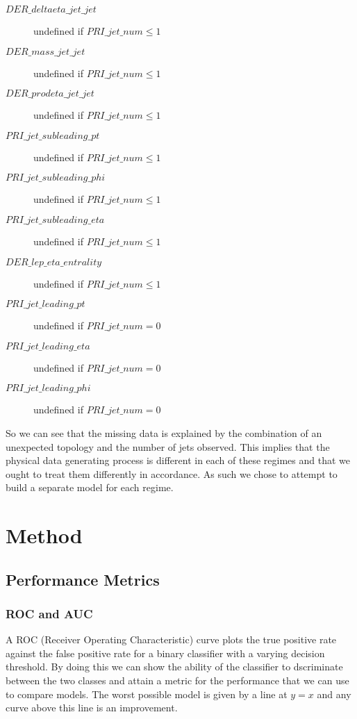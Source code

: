 \begin{description}
    \item[$DER\_deltaeta\_jet\_jet$] undefined if $PRI\_jet\_num \leq 1$
    \item[$DER\_mass\_jet\_jet$] undefined if $PRI\_jet\_num \leq 1$
    \item[$DER\_prodeta\_jet\_jet$] undefined if $PRI\_jet\_num \leq 1$
    \item[$PRI\_jet\_subleading\_pt$] undefined if $PRI\_jet\_num \leq 1$
    \item[$PRI\_jet\_subleading\_phi$] undefined if $PRI\_jet\_num \leq 1$
    \item[$PRI\_jet\_subleading\_eta$] undefined if $PRI\_jet\_num \leq 1$
    \item[$DER\_lep\_eta\_entrality$] undefined if $PRI\_jet\_num \leq 1$
    \item[$PRI\_jet\_leading\_pt$] undefined if $PRI\_jet\_num = 0$
    \item[$PRI\_jet\_leading\_eta$] undefined if $PRI\_jet\_num = 0$
    \item[$PRI\_jet\_leading\_phi$] undefined if $PRI\_jet\_num = 0$   
\end{description}

So we can see that the missing data is explained by the combination of an unexpected topology and the number of jets observed. This implies that the physical data generating process is different in each of these regimes and that we ought to treat them differently in accordance. As such we chose to attempt to build a separate model for each regime. 

\section{Method}
\label{method}

\subsection{Performance Metrics}

\subsubsection{ROC and AUC}
A ROC (Receiver Operating Characteristic) curve plots the true positive rate against the false positive rate for a binary classifier with a varying decision threshold. By doing this we can show the ability of the classifier to dscriminate between the two classes and attain a metric for the performance that we can use to compare models. The worst possible model is given by a line at $y=x$ and any curve above this line is an improvement. 

